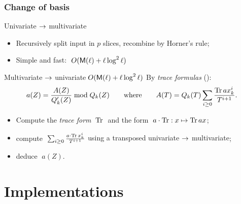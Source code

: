 \documentclass[10pt,usepdftitle=false]{beamer}
\begin{document}

\begin{frame}
  \frametitle{Change of basis}

  \begin{block}{Univariate $\rightarrow$ multivariate}
    \begin{itemize}
    \item Recursively split input in $p$ slices, recombine by
      Horner's rule;
    \item Simple and fast: \emph{$\;O(\mathsf{M}(\ell) + \ell\log^2\ell)$}
    \end{itemize}
  \end{block}

  \vspace{-1mm}

  \begin{block}{Multivariate $\rightarrow$ univariate\hfill\alert{$\;O(\mathsf{M}(\ell) + \ell\log^2\ell)$}}
    By \textit{trace formulas} (\cite{rouiller99}):
    \[
    a(Z) = \frac{A(Z)}{Q_k'(Z)}\bmod Q_k(Z)
    \qquad\text{where}\qquad
    A(T) = Q_k(T)\sum_{i\ge 0}\frac{\operatorname{Tr} ax_k^i}{T^{i+1}}
    \text{.}\]
    \vspace{-4mm}
    \begin{itemize}
    \item Compute the \textit{trace form} $\;\operatorname{Tr}\;$ and the form
      $\;a\cdot\operatorname{Tr} : x\mapsto \operatorname{Tr} ax$;
    \item compute $\;\sum_{i\ge 0}\frac{a\cdot\operatorname{Tr} x_k^i}{T^{i+1}}$
      \alert{using a transposed univariate $\rightarrow$ multivariate};
    \item deduce $\;a(Z)$.
    \end{itemize}
  \end{block}
\end{frame}


\section{Implementations}
\end{document}
